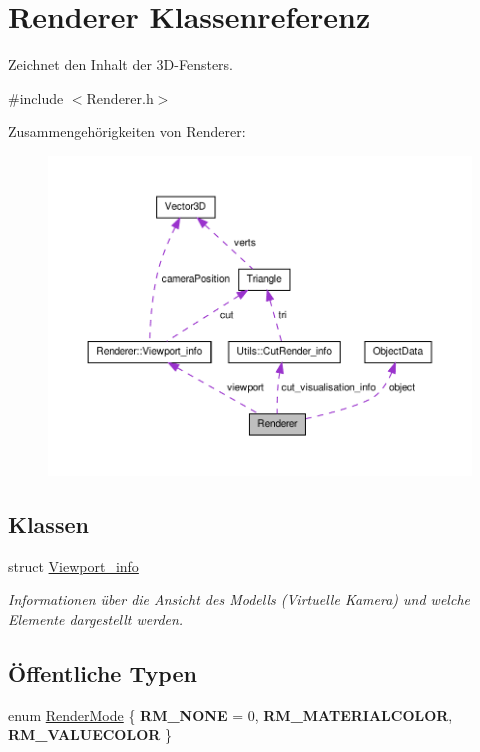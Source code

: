 \hypertarget{classRenderer}{\section{Renderer Klassenreferenz}
\label{classRenderer}
}


Zeichnet den Inhalt der 3\-D-\/\-Fensters.  




{\ttfamily \#include $<$Renderer.\-h$>$}



Zusammengehörigkeiten von Renderer\-:\nopagebreak
\begin{figure}[H]
\begin{center}
\leavevmode
\includegraphics[width=350pt]{classRenderer__coll__graph}
\end{center}
\end{figure}
\subsection*{Klassen}
\begin{DoxyCompactItemize}
\item 
struct \hyperlink{structRenderer_1_1Viewport__info}{Viewport\-\_\-info}
\begin{DoxyCompactList}\small\item\em Informationen über die Ansicht des Modells (Virtuelle Kamera) und welche Elemente dargestellt werden. \end{DoxyCompactList}\end{DoxyCompactItemize}
\subsection*{Öffentliche Typen}
\begin{DoxyCompactItemize}
\item 
enum \hyperlink{classRenderer_aa9844470f59e9fdf3aed088936100863}{Render\-Mode} \{ {\bfseries R\-M\-\_\-\-N\-O\-N\-E} = 0, 
{\bfseries R\-M\-\_\-\-M\-A\-T\-E\-R\-I\-A\-L\-C\-O\-L\-O\-R}, 
{\bfseries R\-M\-\_\-\-V\-A\-L\-U\-E\-C\-O\-L\-O\-R}
 \}
\end{DoxyCompactItemize}
